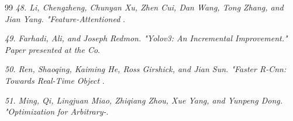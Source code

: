 \documentclass[10pt,twocolumn,final]{article}
\begin{document}
\begin{thebibliography}{99}
\textit{48.	Li, Chengzheng, Chunyan Xu, Zhen Cui, Dan Wang, Tong Zhang, and Jian Yang. "Feature-Attentioned }.

\textit{49.	Farhadi, Ali, and Joseph Redmon. "Yolov3: An Incremental Improvement." Paper presented at the Co}.

\textit{50.	Ren, Shaoqing, Kaiming He, Ross Girshick, and Jian Sun. "Faster R-Cnn: Towards Real-Time Object }.

\textit{51.	Ming, Qi, Lingjuan Miao, Zhiqiang Zhou, Xue Yang, and Yunpeng Dong. "Optimization for Arbitrary-}.

\end{thebibliography}
\end{document}
